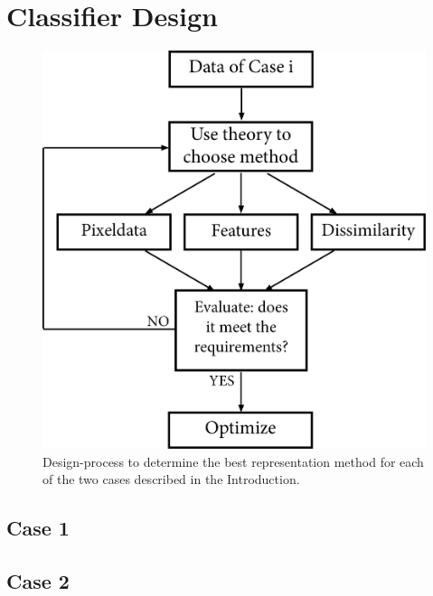 \section{Classifier Design}
\label{sec:ClasDes}

\begin{figure}[H]
	\centering
	\includegraphics[scale=0.55]{images/Case_Design.jpg}
	\caption{Design-process to determine the best representation method for each of the two cases described in the Introduction.}
	\label{fig:case_design}
\end{figure}

\subsection{Case 1}
\label{sec:Case1}

\subsection{Case 2}
\label{sec:Case2}